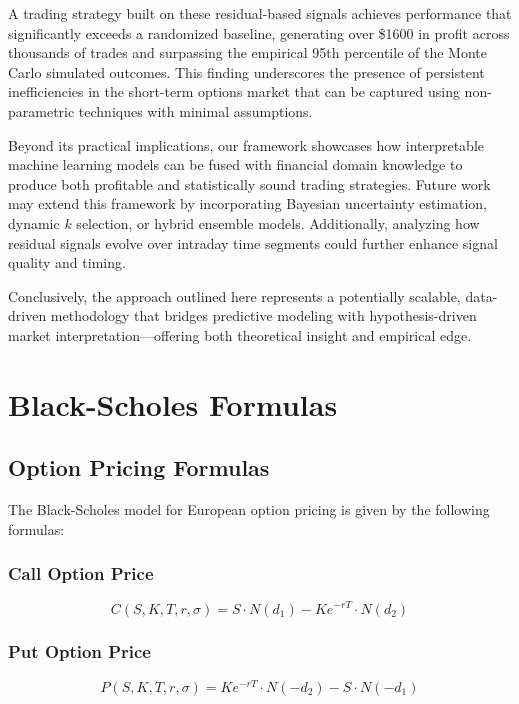 \documentclass{article}
\begin{document}
A trading strategy built on these residual-based signals achieves performance that significantly exceeds a randomized baseline, generating over \$1600 in profit across thousands of trades and surpassing the empirical 95th percentile of the Monte Carlo simulated outcomes. This finding underscores the presence of persistent inefficiencies in the short-term options market that can be captured using non-parametric techniques with minimal assumptions.

Beyond its practical implications, our framework showcases how interpretable machine learning models can be fused with financial domain knowledge to produce both profitable and statistically sound trading strategies. Future work may extend this framework by incorporating Bayesian uncertainty estimation, dynamic $k$ selection, or hybrid ensemble models. Additionally, analyzing how residual signals evolve over intraday time segments could further enhance signal quality and timing.

Conclusively, the approach outlined here represents a potentially scalable, data-driven methodology that bridges predictive modeling with hypothesis-driven market interpretation—offering both theoretical insight and empirical edge.

\appendix
\section{Black-Scholes Formulas}
\subsection{Option Pricing Formulas}
The Black-Scholes model for European option pricing is given by the following formulas:

\subsubsection{Call Option Price}
\begin{equation}
C(S, K, T, r, \sigma) = S \cdot N(d_1) - K e^{-rT} \cdot N(d_2)
\end{equation}

\subsubsection{Put Option Price}
\begin{equation}
P(S, K, T, r, \sigma) = K e^{-rT} \cdot N(-d_2) - S \cdot N(-d_1)
\end{equation}
\end{document}
